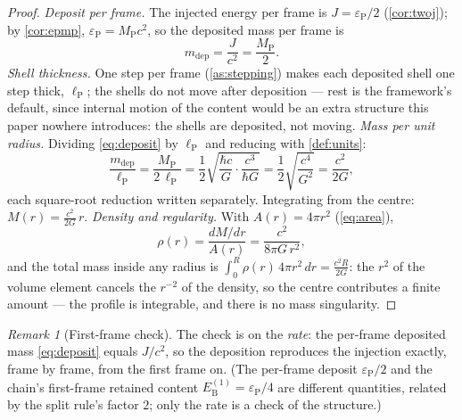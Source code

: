 \documentclass[11pt]{amsbook}
\theoremstyle{plain}
\theoremstyle{definition}
\theoremstyle{remark}
\newtheorem{remark}[theorem]{Remark}
\begin{document}
\begin{proof}
\emph{Deposit per frame.} The injected energy per frame is $J = \varepsilon_{\mathrm P}/2$ (\cref{cor:twoj}); by \cref{cor:epmp}, $\varepsilon_{\mathrm P} = M_{\mathrm P}c^{2}$, so the deposited mass per frame is
\begin{equation}\label{eq:deposit}
m_{\mathrm{dep}} = \frac{J}{c^{2}} = \frac{M_{\mathrm P}}{2}.
\end{equation}
\emph{Shell thickness.} One step per frame (\cref{as:stepping}) makes each deposited shell one step thick, $\ell_{\mathrm P}$; the shells do not move after deposition --- rest is the framework's default, since internal motion of the content would be an extra structure this paper nowhere introduces: the shells are deposited, not moving.
\emph{Mass per unit radius.} Dividing \cref{eq:deposit} by $\ell_{\mathrm P}$ and reducing with \cref{def:units}:
\begin{equation}\label{eq:surface-density}
\frac{m_{\mathrm{dep}}}{\ell_{\mathrm P}} = \frac{M_{\mathrm P}}{2\,\ell_{\mathrm P}}
= \frac{1}{2}\sqrt{\frac{\hbar c}{G}\cdot\frac{c^{3}}{\hbar G}}
= \frac{1}{2}\sqrt{\frac{c^{4}}{G^{2}}}
= \frac{c^{2}}{2G},
\end{equation}
each square-root reduction written separately. Integrating from the centre: $M(r) = \frac{c^{2}}{2G}\,r$.
\emph{Density and regularity.} With $A(r) = 4\pi r^{2}$ (\cref{eq:area}),
\begin{equation}\label{eq:densityprofile}
\rho(r) = \frac{dM/dr}{A(r)} = \frac{c^{2}}{8\pi G\, r^{2}},
\end{equation}
and the total mass inside any radius is $\int_{0}^{R} \rho(r)\,4\pi r^{2}\,dr = \frac{c^{2}R}{2G}$: the $r^{2}$ of the volume element cancels the $r^{-2}$ of the density, so the centre contributes a finite amount --- the profile is integrable, and there is no mass singularity.
\end{proof}

\begin{remark}[First-frame check]\label{rem:firstframe-check}
The check is on the \emph{rate}: the per-frame deposited mass \cref{eq:deposit} equals $J/c^{2}$, so the deposition reproduces the injection exactly, frame by frame, from the first frame on. (The per-frame deposit $\varepsilon_{\mathrm P}/2$ and the chain's first-frame retained content $E_{\mathrm B}^{(1)} = \varepsilon_{\mathrm P}/4$ are different quantities, related by the split rule's factor $2$; only the rate is a check of the structure.)
\end{remark}
\end{document}
